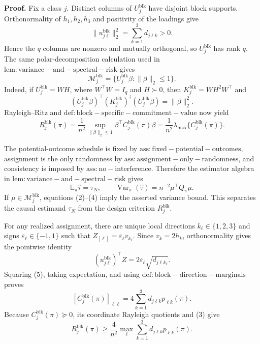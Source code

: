 \textbf{Proof.}
Fix a class \(j\).  Distinct columns of \(U_j^{\mathrm{blk}}\) have disjoint block supports.  Orthonormality of \(h_1,h_2,h_3\) and positivity of the loadings give
\[
\|u_{j\ell}^{\mathrm{blk}}\|_2^2
=\sum_{k=1}^3d_{j\ell k}>0.
\tag{1}
\]
Hence the \(q\) columns are nonzero and mutually orthogonal, so \(U_j^{\mathrm{blk}}\) has rank \(q\).  The same polar-decomposition calculation used in \(\mathrm{lem:variance-and-spectral-risk}\) gives
\[
\mathcal M_j^{\mathrm{blk}}
=\{U_j^{\mathrm{blk}}\beta:\|\beta\|_2\le1\}.
\tag{2}
\]
Indeed, if \(U_j^{\mathrm{blk}}=WH\), where \(W^\top W=I_q\) and \(H\succ0\), then \(K_j^{\mathrm{blk}}=WH^2W^\top\) and
\[
(U_j^{\mathrm{blk}}\beta)^\top(K_j^{\mathrm{blk}})^\dagger
(U_j^{\mathrm{blk}}\beta)=\|\beta\|_2^2.
\]
Rayleigh--Ritz and \(\mathrm{def:block-specific-commitment-value}\) now yield
\[
R_j^{\mathrm{blk}}(\pi)
=\frac1{n^2}\sup_{\|\beta\|_2\le1}
\beta^\top C_j^{\mathrm{blk}}(\pi)\beta
=\frac1{n^2}\lambda_{\max}\{C_j^{\mathrm{blk}}(\pi)\}.
\tag{3}
\]

The potential-outcome schedule is fixed by \(\mathrm{ass:fixed-potential-outcomes}\), assignment is the only randomness by \(\mathrm{ass:assignment-only-randomness}\), and consistency is imposed by \(\mathrm{ass:no-interference}\).  Therefore the estimator algebra in \(\mathrm{lem:variance-and-spectral-risk}\) gives
\[
\mathbb E_\pi\widehat\tau=\tau_N,
\qquad
\operatorname{Var}_\pi(\widehat\tau)=n^{-2}\mu^\top Q_\pi\mu.
\tag{4}
\]
If \(\mu\in\mathcal M_j^{\mathrm{blk}}\), equations (2)--(4) imply the asserted variance bound.  This separates the causal estimand \(\tau_N\) from the design criterion \(R_j^{\mathrm{blk}}\).

For any realized assignment, there are unique local directions \(k_\ell\in\{1,2,3\}\) and signs \(\varepsilon_\ell\in\{-1,1\}\) such that \(Z_{[\ell]}=\varepsilon_\ell v_{k_\ell}\).  Since \(v_k=2h_k\), orthonormality gives the pointwise identity
\[
(u_{j\ell}^{\mathrm{blk}})^\top Z
=2\varepsilon_\ell\sqrt{d_{j\ell k_\ell}}.
\tag{5}
\]
Squaring (5), taking expectation, and using \(\mathrm{def:block-direction-marginals}\) proves
\[
[C_j^{\mathrm{blk}}(\pi)]_{\ell\ell}
=4\sum_{k=1}^3d_{j\ell k}p_{\ell k}(\pi).
\tag{6}
\]
Because \(C_j^{\mathrm{blk}}(\pi)\succeq0\), its coordinate Rayleigh quotients and (3) give
\[
R_j^{\mathrm{blk}}(\pi)
\ge\frac4{n^2}\max_\ell
\sum_{k=1}^3d_{j\ell k}p_{\ell k}(\pi).
\tag{7}
\]

